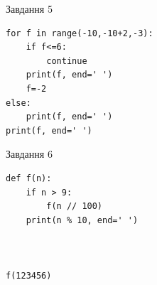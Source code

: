\documentclass[12pt, ukrainian]{article}
\begin{document}
{\vspace{15mm}
\begin{minipage}[t]{9.7cm}                
{\begin{center}Завдання {5}\end{center}}
\begin{verbatim}
for f in range(-10,-10+2,-3):
    if f<=6:
        continue
    print(f, end=' ')
    f=-2
else:
    print(f, end=' ')
print(f, end=' ')
\end{verbatim}     
\end{minipage}
\vline \hspace{8mm}
\begin{minipage}[t]{8.0cm}                
{\begin{center}Завдання {6}\end{center}}
\begin{verbatim}
def f(n):
    if n > 9:
        f(n // 100)
    print(n % 10, end=' ')
    


f(123456)
\end{verbatim}     
\end{minipage}

}
\newpage
\end{document}

